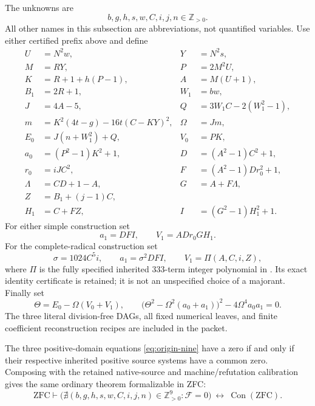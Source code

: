 The unknowns are
\[
       b,g,h,s,w,C,i,j,n\in\mathbb Z_{>0}.
\]
All other names in this subsection are abbreviations, not quantified
variables.  Use either certified prefix above and define
\begin{align*}
 U&=N^2w,&Y&=N^2s,\\
 M&=RY,&P&=2M^2U,\\
 K&=R+1+h(P-1),&A&=M(U+1),\\
 B_1&=2R+1,&W_1&=bw,\\
 J&=4A-5,&Q&=3W_1C-2(W_1^2-1),\\
 m&=K^2(4t-g)-16t(C-KY)^2,&\Omega&=Jm,\\
 E_0&=J(n+W_1^2)+Q,&V_0&=PK,\\
 a_0&=(P^2-1)K^2+1,&D&=(A^2-1)C^2+1,\\
 r_0&=iJC^2,&F&=(A^2-1)Dr_0^2+1,\\
 \Lambda&=CD+1-A,&G&=A+F\Lambda,\\
 Z&=B_1+(j-1)C,&&\\
 H_1&=C+FZ,&I&=(G^2-1)H_1^2+1.
\end{align*}
For either simple construction set
\[
        a_1=DFI,\qquad V_1=ADr_0GH_1.
\]
For the complete-radical construction set
\[
 \sigma=1024C^5i,\qquad a_1=\sigma^2DFI,\qquad
 V_1=\Pi(A,C,i,Z),
\]
where $\Pi$ is the fully specified inherited 333-term integer polynomial
in .
Its exact identity certificate is retained; it is not an unspecified
choice of a majorant.  Finally set
\begin{equation}
 \Theta=E_0-\Omega(V_0+V_1),\qquad
 \boxed{\bigl(\Theta^2-\Omega^2(a_0+a_1)\bigr)^2
                   -4\Omega^4a_0a_1=0.}
 \label{eq:origin-nine}
\end{equation}
The three literal division-free DAGs, all fixed numerical leaves, and
finite coefficient reconstruction recipes are included in the packet.

\begin{theorem}
The three positive-domain equations \eqref{eq:origin-nine} have a zero
if and only if their respective inherited positive source systems have
a common zero.  Composing with the retained native-source and
machine/refutation calibration gives the same ordinary theorem
formalizable in ZFC:
\[
 \mathrm{ZFC}\vdash
 \bigl(\nexists(b,g,h,s,w,C,i,j,n)\in\mathbb Z_{>0}^9:
       \mathcal F=0\bigr)\ \longleftrightarrow\ \operatorname{Con}(\mathrm{ZFC}).
\]
\end{theorem}


